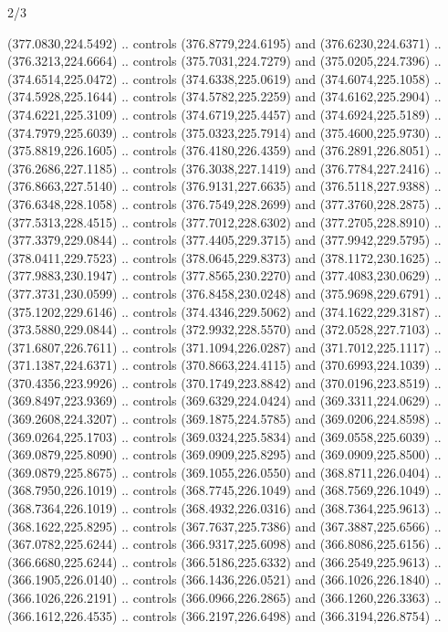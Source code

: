 \begin{flagdescription}{2/3}
\begin{scope}[xshift=0.5\flaglength,yshift=0.5\flagwidth,scale=\flagwidth/495.65]
\begin{scope}[y=0.8pt, x=0.8pt, yscale=-1,shift={(-463.76,-309.78)}]
  (377.0830,224.5492) .. controls (376.8779,224.6195) and (376.6230,224.6371) ..
  (376.3213,224.6664) .. controls (375.7031,224.7279) and (375.0205,224.7396) ..
  (374.6514,225.0472) .. controls (374.6338,225.0619) and (374.6074,225.1058) ..
  (374.5928,225.1644) .. controls (374.5782,225.2259) and (374.6162,225.2904) ..
  (374.6221,225.3109) .. controls (374.6719,225.4457) and (374.6924,225.5189) ..
  (374.7979,225.6039) .. controls (375.0323,225.7914) and (375.4600,225.9730) ..
  (375.8819,226.1605) .. controls (376.4180,226.4359) and (376.2891,226.8051) ..
  (376.2686,227.1185) .. controls (376.3038,227.1419) and (376.7784,227.2416) ..
  (376.8663,227.5140) .. controls (376.9131,227.6635) and (376.5118,227.9388) ..
  (376.6348,228.1058) .. controls (376.7549,228.2699) and (377.3760,228.2875) ..
  (377.5313,228.4515) .. controls (377.7012,228.6302) and (377.2705,228.8910) ..
  (377.3379,229.0844) .. controls (377.4405,229.3715) and (377.9942,229.5795) ..
  (378.0411,229.7523) .. controls (378.0645,229.8373) and (378.1172,230.1625) ..
  (377.9883,230.1947) .. controls (377.8565,230.2270) and (377.4083,230.0629) ..
  (377.3731,230.0599) .. controls (376.8458,230.0248) and (375.9698,229.6791) ..
  (375.1202,229.6146) .. controls (374.4346,229.5062) and (374.1622,229.3187) ..
  (373.5880,229.0844) .. controls (372.9932,228.5570) and (372.0528,227.7103) ..
  (371.6807,226.7611) .. controls (371.1094,226.0287) and (371.7012,225.1117) ..
  (371.1387,224.6371) .. controls (370.8663,224.4115) and (370.6993,224.1039) ..
  (370.4356,223.9926) .. controls (370.1749,223.8842) and (370.0196,223.8519) ..
  (369.8497,223.9369) .. controls (369.6329,224.0424) and (369.3311,224.0629) ..
  (369.2608,224.3207) .. controls (369.1875,224.5785) and (369.0206,224.8598) ..
  (369.0264,225.1703) .. controls (369.0324,225.5834) and (369.0558,225.6039) ..
  (369.0879,225.8090) .. controls (369.0909,225.8295) and (369.0909,225.8500) ..
  (369.0879,225.8675) .. controls (369.1055,226.0550) and (368.8711,226.0404) ..
  (368.7950,226.1019) .. controls (368.7745,226.1049) and (368.7569,226.1049) ..
  (368.7364,226.1019) .. controls (368.4932,226.0316) and (368.7364,225.9613) ..
  (368.1622,225.8295) .. controls (367.7637,225.7386) and (367.3887,225.6566) ..
  (367.0782,225.6244) .. controls (366.9317,225.6098) and (366.8086,225.6156) ..
  (366.6680,225.6244) .. controls (366.5186,225.6332) and (366.2549,225.9613) ..
  (366.1905,226.0140) .. controls (366.1436,226.0521) and (366.1026,226.1840) ..
  (366.1026,226.2191) .. controls (366.0966,226.2865) and (366.1260,226.3363) ..
  (366.1612,226.4535) .. controls (366.2197,226.6498) and (366.3194,226.8754) ..

\end{scope}
\end{scope}
\end{flagdescription}
